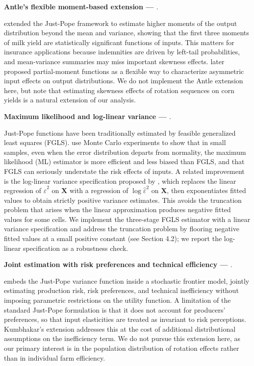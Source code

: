 \documentclass[12pt,letterpaper]{article}
\theoremstyle{remark}
\theoremstyle{plain}
\theoremstyle{definition}
\begin{document}
\textbf{Antle's flexible moment-based extension — \cite{antle1983, Antle2010}}. 

\cite{antle1983} extended the Just-Pope framework to estimate higher moments of the output distribution beyond the mean and variance, showing that the first three moments of milk yield are statistically significant functions of inputs. This matters for
insurance applications because indemnities are driven by left-tail probabilities, and mean-variance summaries may miss important skewness effects. \cite{Antle2010} later proposed partial-moment functions as a flexible way to characterize asymmetric input effects on output distributions. We do not implement the Antle extension here, but note that estimating skewness effects of rotation sequences on corn yields is a natural extension of our analysis.

\textbf{Maximum likelihood and log-linear variance — \cite{Harvey1976, Saha1997}}. 

Just-Pope functions have been traditionally estimated by feasible generalized least squares (FGLS). \cite{Saha1997} use Monte Carlo
experiments to show that in small samples, even when the error distribution departs from normality, the maximum likelihood (ML) estimator is more efficient and less biased than FGLS, and that FGLS can seriously understate the risk effects of inputs. A related improvement is the log-linear variance specification proposed by \cite{Harvey1976}, which replaces the linear regression of $\hat{\varepsilon}^2$ on $\mathbf{X}$ with a regression of $\log \hat{\varepsilon}^2$ on $\mathbf{X}$, then exponentiates fitted values to obtain strictly positive variance estimates. This avoids the truncation problem that arises when the linear approximation produces negative fitted values for some cells. We implement the three-stage FGLS estimator with a linear variance specification and
address the truncation problem by flooring negative fitted values at a small positive constant (see Section 4.2); we report the log-linear specification as a robustness check.

\textbf{Joint estimation with risk preferences and technical efficiency — \cite{Kumbhakar2002}}.

\cite{Kumbhakar2002} embeds the Just-Pope variance function inside a stochastic frontier model, jointly estimating production risk, risk preferences, and technical inefficiency without imposing parametric restrictions on the utility function. A limitation of the standard Just-Pope formulation is that it does not account for producers'  preferences, so that input elasticities are treated as invariant to risk perceptions. Kumbhakar's extension addresses this at the cost of additional distributional assumptions on the inefficiency term. We do not pursue this extension here, as our primary interest is in the population distribution of rotation effects rather than in individual farm efficiency.
\end{document}
